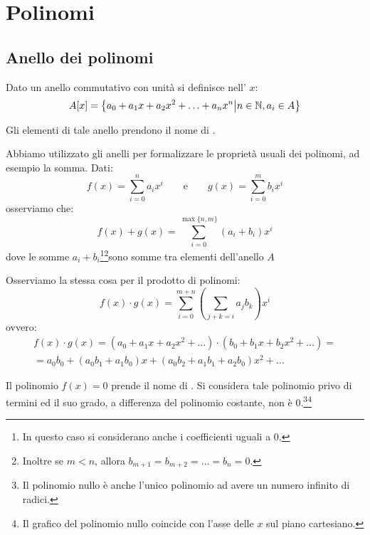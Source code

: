 \documentclass[11pt]{scrartcl}
\begin{document}
\newpage
\section{Polinomi}
\subsection{Anello dei polinomi}
\begin{definition}
Dato un anello commutativo con unità si definisce  nell' $x$:
	\[ A[x] = \left\{a_0+a_1x+a_2x^2+\ldots+a_nx^n \middle| n \in \mathbb N, a_i \in A\right\}
	\]
\end{definition}

Gli elementi di tale anello prendono il nome di .

\begin{remark}
\label{p:sum}
Abbiamo utilizzato gli anelli per formalizzare le proprietà usuali dei polinomi, ad esempio la somma. Dati:
	\[ f(x) = \sum_{i=0}^n a_ix^i
	\qquad
	\text{e}
	\qquad
	g(x) = \sum_{i=0}^m b_ix^i
	\]
osserviamo che:
	\[ f(x)+g(x)=\sum_{i=0}^{\max\{n,m\}} (a_i+b_i)x^i
	\]
dove le somme $a_i+b_i$\footnote{In questo caso si considerano anche i coefficienti uguali a $0$.}\footnote{Inoltre se $m<n$, allora $b_{m+1} = b_{m+2} = \ldots =b_n=0$.}sono somme tra elementi dell'anello $A$
\end{remark}

\begin{remark}
Osserviamo la stessa cosa per il prodotto di polinomi:
	\[ f(x) \cdot g(x) = \sum_{i=0}^{m+n}\left(\sum_{j+k=i} a_jb_k\right)x^i
	\]
ovvero:
	\begin{align*}
	f(x) \cdot g(x) = (a_0 +a_1x + a_2x^2 + \ldots) \cdot (b_0 + b_1x + b_2x^2 + \ldots) = \\
	= a_0b_0 + (a_0b_1 + a_1b_0)x+(a_0b_2 + a_1b_1 + a_2b_0)x^2 + \ldots
	\end{align*}
\end{remark}

\begin{remark}
\label{3.4}
Il polinomio $f(x)=0$ prende il nome di . Si considera tale polinomio privo di termini ed il suo grado, a differenza del polinomio costante, non è $0$.\footnote{Il polinomio nullo è anche l'unico polinomio ad avere un numero infinito di radici.}\footnote{Il grafico del polinomio nullo coincide con l'asse delle $x$ sul piano cartesiano.} 
\end{remark}
\end{document}
